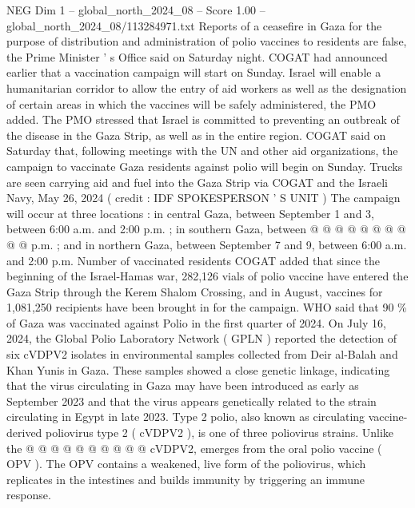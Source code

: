 \begin{textsample}{NEG Dim 1 – global\_north\_2024\_08 – Score 1.00 – global\_north\_2024\_08/113284971.txt}  \label{ex:f1_neg_383}
Reports of a ceasefire in Gaza for the purpose of distribution and administration of polio vaccines to residents are false, the Prime Minister ' s Office said on Saturday night.
COGAT had announced earlier that a vaccination campaign will start on Sunday.
Israel will enable a humanitarian corridor to allow the entry of aid workers as well as the designation of certain areas in which the vaccines will be safely administered, the PMO added.
The PMO stressed that Israel is committed to preventing an outbreak of the disease in the Gaza Strip, as well as in the entire region.
COGAT said on Saturday that, following meetings with the UN and other aid organizations, the campaign to vaccinate Gaza residents against polio will begin on Sunday.
Trucks are seen carrying aid and fuel into the Gaza Strip via COGAT and the Israeli Navy, May 26, 2024 ( credit : IDF SPOKESPERSON ' S UNIT ) The campaign will occur at three locations : in central Gaza, between September 1 and 3, between 6:00 a.m. and 2:00 p.m. ; in southern Gaza, between @ @ @ @ @ @ @ @ @ @ p.m. ; and in northern Gaza, between September 7 and 9, between 6:00 a.m. and 2:00 p.m.
Number of vaccinated residents COGAT added that since the beginning of the Israel-Hamas war, 282,126 vials of polio vaccine have entered the Gaza Strip through the Kerem Shalom Crossing, and in August, vaccines for 1,081,250 recipients have been brought in for the campaign.
WHO said that 90 \% of Gaza was vaccinated against Polio in the first quarter of 2024.
On July 16, 2024, the Global Polio Laboratory Network ( GPLN ) reported the detection of six cVDPV2 isolates in environmental samples collected from Deir al-Balah and Khan Yunis in Gaza.
These samples showed a close genetic linkage, indicating that the virus circulating in Gaza may have been introduced as early as September 2023 and that the virus appears genetically related to the strain circulating in Egypt in late 2023.
Type 2 polio, also known as circulating vaccine-derived poliovirus type 2 ( cVDPV2 ), is one of three poliovirus strains.
Unlike the @ @ @ @ @ @ @ @ @ @ cVDPV2, emerges from the oral polio vaccine ( OPV ).
The OPV contains a weakened, live form of the poliovirus, which replicates in the intestines and builds immunity by triggering an immune response.

\end{textsample}
